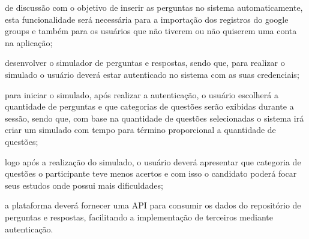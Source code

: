 \begin{alineas}
    de discussão com o objetivo de inserir as perguntas no sistema
    automaticamente, esta funcionalidade será necessária para a importação dos
    registros do google groups e também para os usuários que não tiverem ou não
    quiserem uma conta na aplicação;
    \item desenvolver o simulador de perguntas e respostas, sendo que, para
    realizar o simulado o usuário deverá estar autenticado no sistema com as
    suas credenciais;
    \item para iniciar o simulado, após realizar a autenticação, o usuário
    escolherá a quantidade de perguntas e que categorias de questões serão
    exibidas durante a sessão, sendo que, com base na quantidade de questões
    selecionadas o sistema irá criar um simulado com tempo para término
    proporcional a quantidade de questões;
    \item logo após a realização do simulado, o usuário deverá apresentar que 
    categoria de questões o participante teve menos acertos e com isso o
    candidato poderá focar seus estudos onde possui mais dificuldades;
    \item a plataforma deverá fornecer uma \acs{API} para consumir os dados do
    repositório de perguntas e respostas, facilitando a implementação de
    terceiros mediante autenticação.
\end{alineas}

